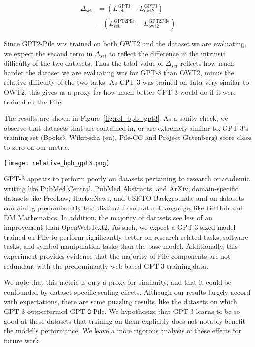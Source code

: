 \documentclass[11pt,a4paper]{article}
\begin{document}
\begin{align*}
    \Delta_{\mathrm{set}} &= \left(L^{\mathrm{GPT3}}_{\mathrm{set}} - L^{\mathrm{GPT3}}_{\mathrm{owt2}}\right)\\
    & - \left(L^{\mathrm{GPT2Pile}}_{\mathrm{set}} - L^{\mathrm{GPT2Pile}}_{\mathrm{owt2}}\right)
\end{align*}

Since GPT2-Pile was trained on both OWT2 and the dataset we are evaluating, we expect the second term in $\Delta_{set}$ to reflect the difference in the intrinsic difficulty of the two datasets. Thus the total value of $\Delta_{set}$ reflects how much harder the dataset we are evaluating was for GPT-3 than OWT2, minus the relative difficulty of the two tasks. As GPT-3 was trained on data very similar to OWT2, this gives us a proxy for how much better GPT-3 would do if it were trained on the Pile.

The results are shown in Figure~\ref{fig:rel_bpb_gpt3}. As a sanity check, we observe that datasets that are contained in, or are extremely similar to, GPT-3's training set (Books3, Wikipedia (en), Pile-CC and Project Gutenberg) score close to zero on our metric.

\begin{figure*}[ht]
  \texttt{[image: relative\_bpb\_gpt3.png]}
  \caption{Change in \textsc{bpb} from GPT-2 trained on Pile to GPT-3 zero-shot, relative to OpenWebText2 \textsc{bpb} change. Dotted line indicates overall Pile change. Lower indicates better relative performance by GPT-3.}
  \label{fig:rel_bpb_gpt3} %
\end{figure*}

GPT-3 appears to perform poorly on datasets pertaining to research or academic writing like PubMed Central, PubMed Abstracts, and ArXiv; domain-specific datasets like FreeLaw, HackerNews, and USPTO Backgrounds; and on datasets containing predominantly text distinct from natural language, like GitHub and DM Mathematics. In addition, the majority of datasets see less of an improvement than OpenWebText2. As such, we expect a GPT-3 sized model trained on Pile to perform significantly better on research related tasks, software tasks, and symbol manipulation tasks than the base model. Additionally, this experiment provides evidence that the majority of Pile components are not redundant with the predominantly web-based GPT-3 training data.

We note that this metric is only a proxy for similarity, and that it could be confounded by dataset specific scaling effects. Although our results largely accord with expectations, there are some puzzling results, like the datasets on which GPT-3 outperformed GPT-2 Pile. We hypothesize that GPT-3 learns to be so good at these datasets that training on them explicitly does not notably benefit the model's performance. We leave a more rigorous analysis of these effects for future work.
\end{document}
